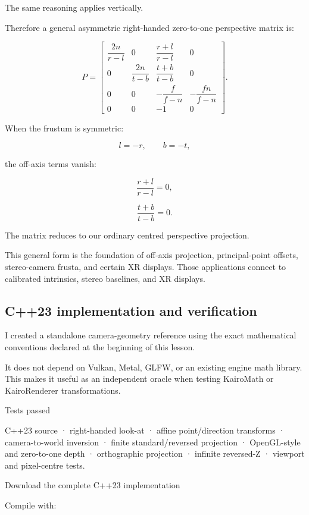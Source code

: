 The same reasoning applies vertically.

Therefore a general asymmetric right-handed zero-to-one perspective matrix is:

\[
 \boxed{ P= \begin{bmatrix} \dfrac{2n}{r-l}&0&\dfrac{r+l}{r-l}&0\\ 0&\dfrac{2n}{t-b}&\dfrac{t+b}{t-b}&0\\ 0&0&-\dfrac f{f-n}&-\dfrac{fn}{f-n}\\ 0&0&-1&0 \end{bmatrix} }.
\]

When the frustum is symmetric:

\[
 l=-r,\qquad b=-t,
\]

the off-axis terms vanish:

\[
 \frac{r+l}{r-l}=0,
\]

\[
 \frac{t+b}{t-b}=0.
\]

The matrix reduces to our ordinary centred perspective projection.

This general form is the foundation of off-axis projection, principal-point offsets, stereo-camera frusta, and certain XR displays. Those applications connect to calibrated intrinsics, stereo baselines, and XR displays.

\subsection{C++23 implementation and verification}\label{02-foundations-ii-ch037-c23-implementation-and-verification}

\hypertarget{02-foundations-ii-ch037-c23-implementation-and-verification}{}

I created a standalone camera-geometry reference using the exact mathematical conventions declared at the beginning of this lesson.

It does not depend on Vulkan, Metal, GLFW, or an existing engine math library. This makes it useful as an independent oracle when testing KairoMath or KairoRenderer transformations.

Tests passed

C++23 source · right-handed look-at · affine point/direction transforms · camera-to-world inversion · finite standard/reversed projection · OpenGL-style and zero-to-one depth · orthographic projection · infinite reversed-Z · viewport and pixel-centre tests.

Download the complete C++23 implementation

Compile with:

